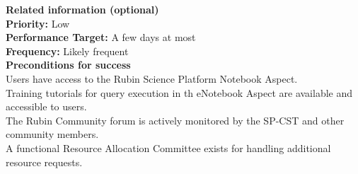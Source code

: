 \textbf{Related information (optional)} \\
\textbf{Priority:} Low \\
\textbf{Performance Target:} A few days at most \\
\textbf{Frequency:} Likely frequent \\

\textbf{Preconditions for success} \\
Users have access to the Rubin Science Platform Notebook Aspect. \\
Training tutorials for query execution in th eNotebook Aspect are available and accessible to users. \\
The Rubin Community forum is actively monitored by the SP-CST and other community members. \\
A functional Resource Allocation Committee exists for handling additional resource requests.\\
